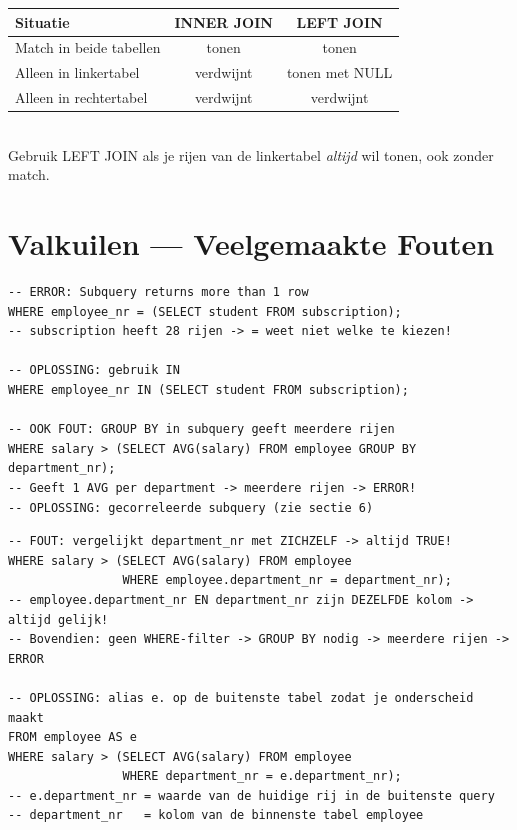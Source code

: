 \documentclass[10pt,a4paper]{article}
\begin{document}
\begin{tcolorbox}[notebox,title=INNER vs LEFT samengevat]
{\footnotesize\begin{tabular}{lcc}
\textbf{Situatie} & \textbf{INNER JOIN} & \textbf{LEFT JOIN} \\ \midrule
Match in beide tabellen & tonen & tonen \\
Alleen in linkertabel & verdwijnt & tonen met NULL \\
Alleen in rechtertabel & verdwijnt & verdwijnt \\
\end{tabular}}\\[2pt]
Gebruik LEFT JOIN als je rijen van de linkertabel \textit{altijd} wil tonen, ook zonder match.
\end{tcolorbox}

\section{Valkuilen --- Veelgemaakte Fouten}

\begin{tcolorbox}[warnbox,title=FOUT 1: = gebruiken als subquery meerdere rijen geeft]
\begin{lstlisting}
-- ERROR: Subquery returns more than 1 row
WHERE employee_nr = (SELECT student FROM subscription);
-- subscription heeft 28 rijen -> = weet niet welke te kiezen!

-- OPLOSSING: gebruik IN
WHERE employee_nr IN (SELECT student FROM subscription);

-- OOK FOUT: GROUP BY in subquery geeft meerdere rijen
WHERE salary > (SELECT AVG(salary) FROM employee GROUP BY department_nr);
-- Geeft 1 AVG per department -> meerdere rijen -> ERROR!
-- OPLOSSING: gecorreleerde subquery (zie sectie 6)
\end{lstlisting}
\end{tcolorbox}

\begin{tcolorbox}[warnbox,title=FOUT 2: Gecorreleerde subquery zonder alias]
\begin{lstlisting}
-- FOUT: vergelijkt department_nr met ZICHZELF -> altijd TRUE!
WHERE salary > (SELECT AVG(salary) FROM employee
                WHERE employee.department_nr = department_nr);
-- employee.department_nr EN department_nr zijn DEZELFDE kolom -> altijd gelijk!
-- Bovendien: geen WHERE-filter -> GROUP BY nodig -> meerdere rijen -> ERROR

-- OPLOSSING: alias e. op de buitenste tabel zodat je onderscheid maakt
FROM employee AS e
WHERE salary > (SELECT AVG(salary) FROM employee
                WHERE department_nr = e.department_nr);
-- e.department_nr = waarde van de huidige rij in de buitenste query
-- department_nr   = kolom van de binnenste tabel employee
\end{lstlisting}
\end{tcolorbox}
\end{document}
